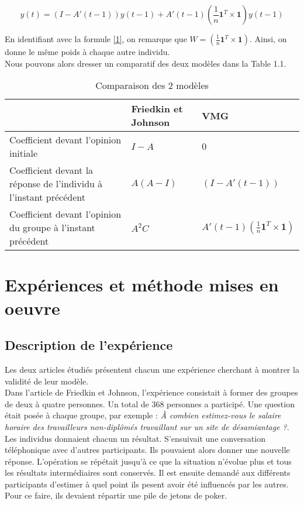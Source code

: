 \documentclass{scrreprt}
\begin{document}
\begin{equation}
\label{3}
y(t) =(I-A'(t-1))y(t-1)+A'(t-1)(\frac{1}{n} \textbf{1} ^T\times \textbf{1}) y(t-1)
\end{equation}

En identifiant avec la formule \ref{1}, on remarque que $W=(\frac{1}{n} \textbf{1} ^T\times \textbf{1})$. Ainsi, on donne le même poids à chaque autre individu.\\

Nous pouvons alors dresser un comparatif des deux modèles dans la Table 1.1.\\

\begin{table}
	\begin{tabular}{|p{4cm}|p{4.5cm}|p{4.5cm}|}
		\hline
 & Friedkin et Johnson & VMG \tabularnewline
		\hline
Coefficient devant l'opinion initiale & $I-A$ & $0$\tabularnewline
		\hline
Coefficient devant la réponse de l'individu à l'instant précédent & $A(A-I)$ & $(I-A'(t-1))$ \tabularnewline
		\hline
Coefficient devant l'opinion du groupe à l'instant précédent & $A^{2}C$ & $A'(t-1)(\frac{1}{n} \textbf{1} ^T\times \textbf{1})$\tabularnewline
		\hline
	\end{tabular}
	\caption{Comparaison des 2 modèles}
\end{table}

\section{Expériences et méthode mises en oeuvre}

\subsection{Description de l'expérience}

Les deux articles étudiés présentent chacun une expérience cherchant à montrer la validité de leur modèle.\\

Dans l’article de Friedkin et Johnson, l’expérience consistait à former des groupes de deux à quatre personnes. Un total de 368 personnes a participé. Une question était posée à chaque groupe, par exemple : \textit{À combien estimez-vous le salaire horaire des travailleurs non-diplômés  travaillant sur un site de désamiantage ?}. Les individus donnaient chacun un résultat. S’ensuivait une conversation téléphonique avec d’autres participants. Ils pouvaient alors donner une nouvelle réponse. L’opération se répétait jusqu’à ce que la situation n’évolue plus et tous les résultats intermédiaires sont conservés. Il est ensuite demandé aux différents participants d’estimer à quel point ils pesent avoir été influencés par les autres. Pour ce faire, ils devaient répartir une pile de jetons de poker.\\
\end{document}
